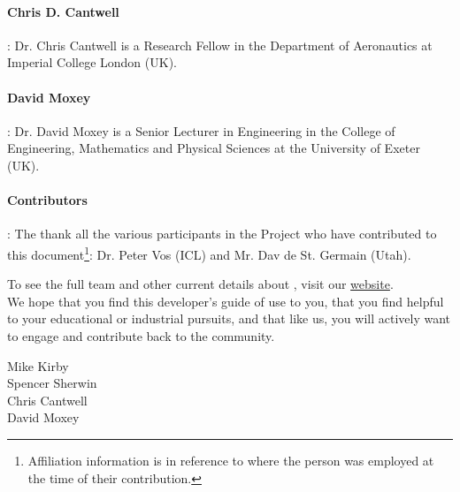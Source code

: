 \paragraph{Chris D. Cantwell}: Dr. Chris Cantwell is a Research Fellow in the Department of Aeronautics at Imperial
College London (UK).

\paragraph{David Moxey}: Dr. David Moxey is a Senior Lecturer in Engineering in the College of Engineering, Mathematics and Physical Sciences
at the University of Exeter (UK).

\paragraph{Contributors}:  The thank all the various participants in the \nek{} Project who have contributed to this document\footnote{Affiliation information is in reference to where the person was employed at the time of their contribution.}:  Dr. Peter Vos (ICL) and Mr. Dav de St. Germain (Utah).

To see the full team and other current details about \nek{}, visit our \href{http://www.nektar.info}{website}. \\

 We hope that you find this developer's guide of 
use to you, that you find \nek{} helpful to your educational or industrial pursuits, and that like us, you will actively want to engage and contribute
back  to the \nek{} community.

Mike Kirby \\
Spencer Sherwin \\
Chris Cantwell \\
David Moxey \\


  